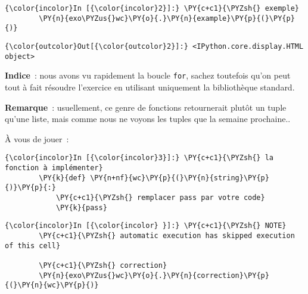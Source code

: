     \begin{Verbatim}[commandchars=\\\{\}]
{\color{incolor}In [{\color{incolor}2}]:} \PY{c+c1}{\PYZsh{} exemple}
        \PY{n}{exo\PYZus{}wc}\PY{o}{.}\PY{n}{example}\PY{p}{(}\PY{p}{)}
\end{Verbatim}


\begin{Verbatim}[commandchars=\\\{\}]
{\color{outcolor}Out[{\color{outcolor}2}]:} <IPython.core.display.HTML object>
\end{Verbatim}
            
    \textbf{Indice}~: nous avons vu rapidement la boucle \texttt{for},
sachez toutefois qu'on peut tout à fait résoudre l'exercice en utilisant
uniquement la bibliothèque standard.

\textbf{Remarque}~: usuellement, ce genre de fonctions retournerait
plutôt un tuple qu'une liste, mais comme nous ne voyons les tuples que
la semaine prochaine..

    À vous de jouer~:

    \begin{Verbatim}[commandchars=\\\{\}]
{\color{incolor}In [{\color{incolor}3}]:} \PY{c+c1}{\PYZsh{} la fonction à implémenter}
        \PY{k}{def} \PY{n+nf}{wc}\PY{p}{(}\PY{n}{string}\PY{p}{)}\PY{p}{:}
            \PY{c+c1}{\PYZsh{} remplacer pass par votre code}
            \PY{k}{pass}
\end{Verbatim}


    \begin{Verbatim}[commandchars=\\\{\}]
{\color{incolor}In [{\color{incolor} }]:} \PY{c+c1}{\PYZsh{} NOTE}
        \PY{c+c1}{\PYZsh{} automatic execution has skipped execution of this cell}
        
        \PY{c+c1}{\PYZsh{} correction}
        \PY{n}{exo\PYZus{}wc}\PY{o}{.}\PY{n}{correction}\PY{p}{(}\PY{n}{wc}\PY{p}{)}
\end{Verbatim}



    
    
    
